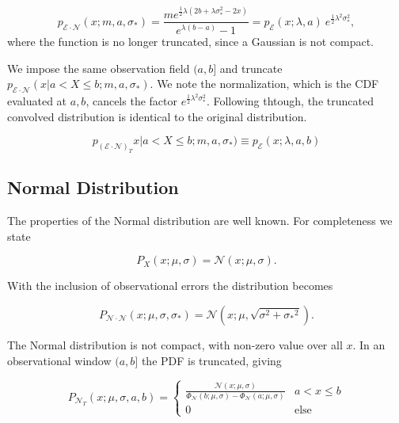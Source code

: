 \documentclass[twocolumn]{aastex631}
\newcommand{\mcal}[1]{\mathcal{#1}}
\newcommand{\Exp}[1]{e^{#1}}
\newcommand{\pdf}{p}
\newcommand{\sigobs}{{\sigma_*}}
\begin{document}
        \begin{equation}
            \pdf_{\mcal{E}\cdot\mcal{N}}(x;m,a,\sigma_*) = \frac{m  e^{\frac{1}{2} \lambda  \left(2 b+\lambda  \sigma _*^2-2 x\right)}}{e^{\lambda  (b-a)}-1} = \pdf_{\mcal{E}}(x;\lambda,a) \ \Exp{\frac{1}{2}\lambda^2 \sigma_*^2},
        \end{equation}
        where the function is no longer truncated, since a Gaussian is not
        compact.

        We impose the same observation field $(a, b]$ and truncate
        $\pdf_{\mcal{E}\cdot\mcal{N}}(x | a < X \leq b;m,a,\sigma_*)$.  We note
        the normalization, which is the CDF evaluated at $a, b$, cancels the
        factor $\Exp{\frac{1}{2}\lambda^2 \sigma_*^2}$. Following thtough, the
        truncated convolved distribution is identical to the original
        distribution.

        \begin{equation}
            \pdf_{(\mcal{E}\cdot\mcal{N})_T}x | a < X \leq b;m,a,\sigma_*) \equiv \pdf_{\mcal{E}}(x; \lambda, a, b)
        \end{equation}

    \vspace{10pt}
    \subsection{Normal Distribution} \label{app:sub:normal_distribution}

        The properties of the Normal distribution are well known. For
        completeness we state

        \begin{equation}
            P_X(x; \mu, \sigma) = \mcal{N}(x; \mu, \sigma).
        \end{equation}

        With the inclusion of observational errors the distribution becomes

        \begin{equation}
            P_{\mcal{N}\cdot\mcal{N}}(x; \mu, \sigma, \sigobs) = \mcal{N}(x; \mu, \sqrt{\sigma^2 + \sigobs^2}).
        \end{equation}

        The Normal distribution is not compact, with non-zero value over all
        $x$. In an observational window $(a,b]$ the PDF is truncated, giving

        \begin{equation}
            P_{\mcal{N}_T}(x; \mu, \sigma, a, b) = \begin{cases}
                \frac{\mcal{N}(x; \mu, \sigma)}{\Phi_\mcal{N}(b; \mu, \sigma) - \Phi_\mcal{N}(a; \mu, \sigma)} & a < x \leq b \\
                0 & \text{else}
            \end{cases}
        \end{equation}
\end{document}
